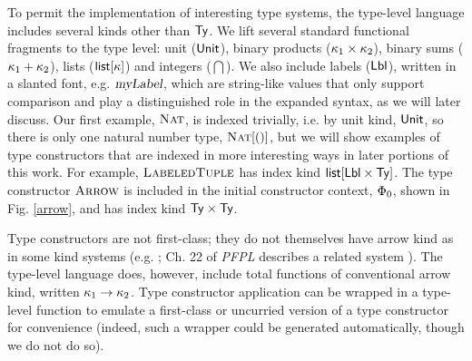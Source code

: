 \documentclass[9pt,preprint]{sigplanconf}
\begin{document}
 To permit the implementation of interesting type systems, the type-level language includes several kinds other than ${\sf Ty}$. We lift several  standard functional fragments to the type level: unit (${\sf Unit}$), binary products ($\kappa_1 \times \kappa_2$), binary sums ($\kappa_1 + \kappa_2$), lists (${\sf list}[\kappa]$) and integers ($\dint$). We also include labels ($\textsf{Lbl}$), written in a slanted font, e.g. $\textsl{myLabel}$, which are string-like values that only support comparison and play a distinguished role in the expanded syntax, as we will later discuss. Our first example, $\textsc{Nat}$, is indexed trivially, i.e. by unit kind, ${\sf Unit}$, so there is only one natural number type, $\textsc{Nat}[()]$, but we will show examples of type constructors that are indexed in more interesting ways in later portions of this work. For example, $\textsc{LabeledTuple}$ has index kind ${\sf list}[\textsf{Lbl} \times {\sf Ty}]$. The type constructor $\textsc{Arrow}$ is included in the initial constructor context, $\Phi_0$, shown in Fig. \ref{arrow}, and has index kind ${\sf Ty} \times {\sf Ty}$.
 
 Type constructors are not first-class; they do not themselves have arrow kind as in some kind systems (e.g.  \cite{watkins2008specifying}; Ch. 22 of \emph{PFPL} describes a related system \cite{pfpl}). The type-level language does, however, include total functions of conventional arrow kind, written $\kappa_1\rightarrow{\kappa_2}$. Type constructor application can be wrapped in a type-level function to emulate a first-class or uncurried version of a type constructor for convenience (indeed, such a wrapper could be generated automatically, though we do not do so). 
\end{document}
